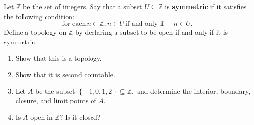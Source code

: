 \documentclass[12pt]{article}
\newenvironment{problem}[2][Problem]{\begin{trivlist}
\item[\hskip \labelsep {\bfseries #1}\hskip \labelsep {\bfseries #2.}]}{\end{trivlist}}
\begin{document}
\begin{problem}{2-17}
Let $\mathbb{Z}$ be the set of integers. Say that a subset $U\subseteq \mathbb{Z}$ is \textbf{symmetric} if it satisfies the following condition: $$ \text{for each} \, n\in \mathbb{Z}, n\in U \, \text{if and only if} \, -n\in U.$$ Define a topology on $\mathbb{Z}$ by declaring a subset to be open if and only if it is symmetric.
\begin{enumerate}[label=(\alph*)]
	\item Show that this is a topology.
	\item Show that it is second countable.
	\item Let $A$ be the subset $\left\{-1,0,1,2\right\}\subseteq \mathbb{Z},$ and determine the interior, boundary, closure, and limit points of $A$.
	\item Is $A$ open in $\mathbb{Z}$? Is it closed?
\end{enumerate}
\end{problem}
\end{document}
